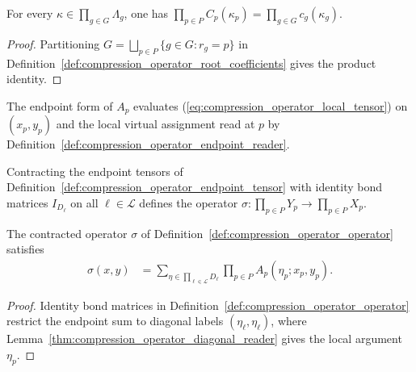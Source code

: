 \begin{lemma}
    \label{thm:compression_operator_coefficient_product}
    \leanok
    For every $\kappa\in\prod_{g\in G}\Lambda_g$, one has $\prod_{p\in P}C_p(\kappa_p)=\prod_{g\in G}c_g(\kappa_g)$.
\end{lemma}

\begin{proof}\leanok
    Partitioning $G=\bigsqcup_{p\in P}\{g\in G:r_g=p\}$ in Definition~\ref{def:compression_operator_root_coefficients} gives the product identity.
\end{proof}

\begin{definition}
    \label{def:compression_operator_endpoint_tensor}
    \leanok
    The endpoint form of $A_p$ evaluates (\ref{eq:compression_operator_local_tensor}) on $(x_p,y_p)$ and the local virtual assignment read at $p$ by Definition~\ref{def:compression_operator_endpoint_reader}.
\end{definition}

\begin{definition}
    \label{def:compression_operator_operator}
    \leanok
    Contracting the endpoint tensors of Definition~\ref{def:compression_operator_endpoint_tensor} with identity bond matrices $I_{D_\ell}$ on all $\ell\in\mathcal L$ defines the operator $\sigma:\prod_{p\in P}Y_p\to\prod_{p\in P}X_p$.
\end{definition}

\begin{lemma}
    \label{thm:compression_operator_link_sum}
    \leanok
    The contracted operator $\sigma$ of Definition~\ref{def:compression_operator_operator} satisfies
    \begin{align}
        \sigma(x,y)
         & =\sum_{\eta\in\prod_{\ell\in\mathcal L}D_\ell}
        \prod_{p\in P}A_p(\eta_p;x_p,y_p).
        \label{eq:compression_operator_link_sum}
    \end{align}
\end{lemma}

\begin{proof}\leanok
    Identity bond matrices in Definition~\ref{def:compression_operator_operator} restrict the endpoint sum to diagonal labels $(\eta_\ell,\eta_\ell)$, where Lemma~\ref{thm:compression_operator_diagonal_reader} gives the local argument $\eta_p$.
\end{proof}

